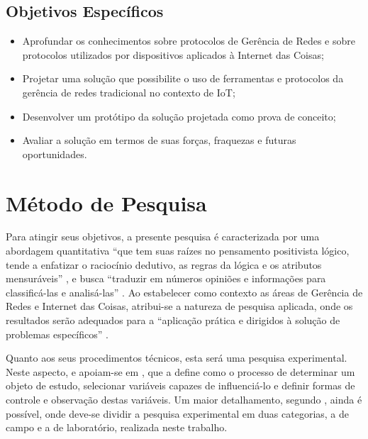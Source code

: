 \documentclass[twoside,english,brazilian]{UNISINOSmonografia}
\begin{document}
\subsection{Objetivos Específicos}

	\begin{itemize}
		\item 
		Aprofundar os conhecimentos sobre protocolos de Gerência de 
		Redes e sobre protocolos utilizados por dispositivos aplicados 
		à Internet das Coisas;
		
		\item
		Projetar uma solução que possibilite o uso de ferramentas e protocolos 
		da gerência de redes tradicional no contexto de IoT;
		
		\item
		Desenvolver um protótipo da solução projetada como prova de conceito;

		\item
		Avaliar a solução em termos de suas forças, fraquezas e futuras 
		oportunidades.
		
	\end{itemize}


\section{Método de Pesquisa}

Para atingir seus objetivos, a presente pesquisa é caracterizada por uma 
abordagem quantitativa 
``que tem suas raízes no pensamento positivista lógico, tende a enfatizar o 
raciocínio dedutivo, as regras da lógica e os atributos mensuráveis''
\cite{Gerhardt2009},
e busca
``traduzir em números opiniões e informações para classificá-las e 
analisá-las''
\cite{MetodologiaUFSC2005}.
Ao estabelecer como contexto as áreas de Gerência de Redes e Internet das 
Coisas, atribui-se a natureza de pesquisa aplicada, onde os resultados serão 
adequados para a
``aplicação prática e dirigidos à solução de problemas específicos''
\cite{MetodologiaUFSC2005}.

Quanto aos seus procedimentos técnicos, esta será uma pesquisa experimental. 
Neste aspecto,  e  
apoiam-se em , que a define como o processo de determinar um 
objeto de estudo, selecionar variáveis capazes de influenciá-lo e definir 
formas de controle e observação destas variáveis.
Um maior detalhamento, segundo , ainda é possível, onde 
deve-se dividir a pesquisa experimental em duas categorias, a de campo e a de 
laboratório, realizada neste trabalho.
\end{document}
